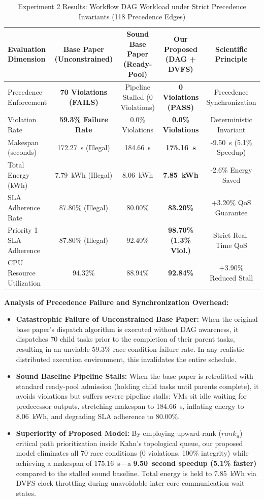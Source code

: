 \documentclass[default,sn-mathphys-num]{sn-jnl}
\theoremstyle{thmstyleone}
\theoremstyle{thmstyletwo}
\theoremstyle{thmstylethree}
\begin{document}
\begin{table}[t]
\caption{Experiment 2 Results: Workflow DAG Workload under Strict Precedence Invariants (118 Precedence Edges)}\label{tab:exp2_results}
\centering
\small
\begin{tabular*}{\textwidth}{@{\extracolsep{\fill}}lcccc@{\extracolsep{\fill}}}
\toprule
\textbf{Evaluation Dimension} & \textbf{Base Paper (Unconstrained)} & \textbf{Sound Base Paper (Ready-Pool)} & \textbf{Our Proposed (DAG + DVFS)} & \textbf{Scientific Principle} \\
\midrule
Precedence Enforcement & \textbf{70 Violations (FAILS)} & Pipeline Stalled (0 Violations) & \textbf{0 Violations (PASS)} & Precedence Synchronization \\
Violation Rate & \textbf{59.3\% Failure Rate} & 0.0\% Violations & \textbf{0.0\% Violations} & Deterministic Invariant \\
Makespan (seconds) & 172.27~s (Illegal) & 184.66~s & \textbf{175.16~s} & -9.50~s (5.1\% Speedup) \\
Total Energy (kWh) & 7.79~kWh (Illegal) & 8.06~kWh & \textbf{7.85~kWh} & -2.6\% Energy Saved \\
SLA Adherence Rate & 87.80\% (Illegal) & 80.00\% & \textbf{83.20\%} & +3.20\% QoS Guarantee \\
Priority 1 SLA Adherence & 87.80\% (Illegal) & 92.40\% & \textbf{98.70\% (1.3\% Viol.)} & Strict Real-Time QoS \\
CPU Resource Utilization & 94.32\% & 88.94\% & \textbf{92.84\%} & +3.90\% Reduced Stall \\
\bottomrule
\end{tabular*}
\end{table}

\noindent \textbf{Analysis of Precedence Failure and Synchronization Overhead:}
\begin{itemize}
    \item \textbf{Catastrophic Failure of Unconstrained Base Paper:} When the original base paper's dispatch algorithm is executed without DAG awareness, it dispatches 70 child tasks prior to the completion of their parent tasks, resulting in an unviable 59.3\% race condition failure rate. In any realistic distributed execution environment, this invalidates the entire schedule.
    \item \textbf{Sound Baseline Pipeline Stalls:} When the base paper is retrofitted with standard ready-pool admission (holding child tasks until parents complete), it avoids violations but suffers severe pipeline stalls: VMs sit idle waiting for predecessor outputs, stretching makespan to 184.66~s, inflating energy to 8.06~kWh, and degrading SLA adherence to 80.00\%.
    \item \textbf{Superiority of Proposed Model:} By employing upward-rank ($rank_u$) critical path prioritization inside Kahn's topological queue, our proposed model eliminates all 70 race conditions (0 violations, 100\% integrity) while achieving a makespan of 175.16~s---a \textbf{9.50~second speedup (5.1\% faster)} compared to the stalled sound baseline. Total energy is held to 7.85~kWh via DVFS clock throttling during unavoidable inter-core communication wait states.
\end{itemize}
\end{document}
